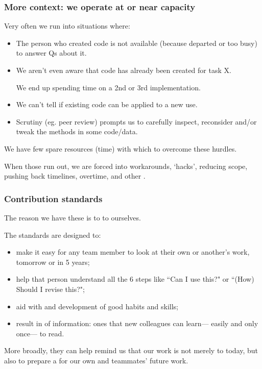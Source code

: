 \documentclass[12pt,aspectratio=169]{beamer}
\begin{document}
\begin{frame}
\frametitle{More context: we operate at or near capacity}

Very often we run into situations where:
\begin{itemize}
  \item The person who created code is not available
    (because departed or too busy) to answer Qs about it.
  \item We aren't even aware that code has already been created for task X.

    We end up spending time on a 2nd or 3rd implementation.
  \item We can't tell if existing code can be applied to a new use.
  \item Scrutiny (eg. peer review) prompts us to carefully inspect,
    reconsider and/or tweak the methods in some code/data.
\end{itemize}

\medskip
We have few spare resources (time)
with which to overcome these hurdles.

\medskip
When those run out, we are forced into workarounds,
‘hacks',
reducing scope,
pushing back timelines,
overtime,
and other .
\end{frame}

\begin{frame}
\frametitle{Contribution standards}

The reason we have these is to  to ourselves.

\medskip
The standards are designed to:
\begin{itemize}
  \item make it easy for any team member to look at their own or another's work,
  tomorrow or in 5 years;
  \item help that person understand all the 6 steps  like
    “Can I use this?" or “(How) Should I revise this?";
  \item aid with  and development of good habits and skills;
  \item result in  of information: ones that new colleagues can learn—%
    easily and only once—%
    to read.
\end{itemize}

More broadly, they can help remind us that our work is not merely to  today, but also to prepare a  for our own and teammates' future work.
\end{frame}
\end{document}
